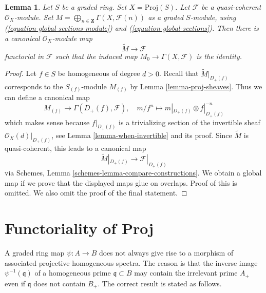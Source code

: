 \documentclass{stacks-project}
\theoremstyle{plain}
\newtheorem{lemma}[subsection]{Lemma}
\theoremstyle{definition}
\theoremstyle{remark}
\numberwithin{equation}{subsection}
\begin{document}
\begin{lemma}
\label{lemma-comparison-proj-quasi-coherent}
Let $S$ be a graded ring. Set $X = \text{Proj}(S)$.
Let $\mathcal{F}$ be a quasi-coherent $\mathcal{O}_X$-module.
Set $M = \bigoplus_{n \in \mathbf{Z}} \Gamma(X, \mathcal{F}(n))$ as
a graded $S$-module, using
(\ref{equation-global-sections-module}) and (\ref{equation-global-sections}).
Then there is a canonical $\mathcal{O}_X$-module map
$$
\widetilde{M} \longrightarrow \mathcal{F}
$$
functorial in $\mathcal{F}$ such that the induced map
$M_0 \to \Gamma(X, \mathcal{F})$ is the identity.
\end{lemma}

\begin{proof}
Let $f \in S$ be homogeneous of degree $d > 0$. Recall that
$\widetilde{M}|_{D_{+}(f)}$ corresponds to the
$S_{(f)}$-module $M_{(f)}$ by Lemma \ref{lemma-proj-sheaves}.
Thus we can define a canonical map
$$
M_{(f)} \longrightarrow \Gamma(D_+(f), \mathcal{F}),\quad
m/f^n \longmapsto m|_{D_+(f)} \otimes f|_{D_+(f)}^{-n}
$$
which makes sense because $f|_{D_+(f)}$ is a trivializing
section of the invertible sheaf $\mathcal{O}_X(d)|_{D_+(f)}$, see
Lemma \ref{lemma-when-invertible} and its proof.
Since $\widetilde{M}$ is quasi-coherent, this leads to a canonical
map
$$
\widetilde{M}|_{D_+(f)} \longrightarrow \mathcal{F}|_{D_+(f)}
$$
via Schemes, Lemma \ref{schemes-lemma-compare-constructions}.
We obtain a global map if we prove that the displayed maps glue on overlaps.
Proof of this is omitted. We also omit the proof of the final statement.
\end{proof}










\section{Functoriality of Proj}
\label{section-functoriality-proj}

\noindent
A graded ring map $\psi : A \to B$ does not always give rise to a morphism of
associated projective homogeneous spectra. The reason is that
the inverse image $\psi^{-1}(\mathfrak q)$
of a homogeneous prime $\mathfrak q \subset B$ may
contain the irrelevant prime $A_{+}$ even if $\mathfrak q$ does not
contain $B_{+}$.
The correct result is stated as follows.
\end{document}
